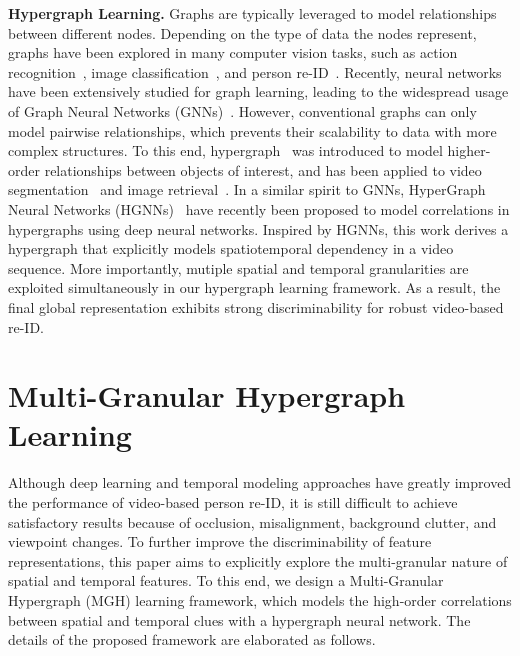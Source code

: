 \documentclass[10pt,twocolumn,letterpaper]{article}
\begin{document}
\textbf{Hypergraph Learning.}
Graphs are typically leveraged to model relationships between different nodes. Depending on the type of data the nodes represent, graphs have been explored in many computer vision tasks, such as action recognition~\cite{DBLP:conf/eccv/WangG18}, image classification~\cite{DBLP:conf/cvpr/ChenWWG19}, and person re-ID~\cite{DBLP:conf/cvpr/Chen0LSW18,DBLP:conf/eccv/ShenLYCW18}. Recently,
neural networks have been extensively studied for graph learning, leading to the widespread usage of Graph Neural Networks (GNNs)~\cite{DBLP:journals/tnn/ScarselliGTHM09,DBLP:conf/nips/DefferrardBV16,DBLP:conf/nips/DuvenaudMABHAA15,DBLP:conf/miccai/KtenaPFRLGR17,Wang_2019_ICCV}. However, conventional graphs can only model pairwise relationships, which prevents their scalability to data with more complex structures. To this end, hypergraph~\cite{DBLP:conf/nips/ZhouHS06} was introduced to model higher-order relationships between objects of interest, and has been applied to video segmentation~\cite{DBLP:conf/cvpr/HuangLM09} and image retrieval~\cite{DBLP:conf/cvpr/HuangLZM10}. In a similar spirit to GNNs, HyperGraph Neural Networks (HGNNs)~\cite{DBLP:conf/aaai/FengYZJG19,DBLP:journals/corr/abs-1809-02589,DBLP:journals/corr/abs-1901-08150,DBLP:conf/ijcai/JiangWFCG19} have recently been proposed to model correlations in hypergraphs using deep neural networks. Inspired by HGNNs, this work derives a hypergraph that explicitly models spatiotemporal dependency in a video sequence. More importantly, mutiple spatial and temporal granularities are exploited simultaneously in our hypergraph learning framework. As a result, the final global representation exhibits strong discriminability for robust video-based re-ID.


\section{Multi-Granular Hypergraph Learning}
Although deep learning and temporal modeling approaches have greatly improved the performance of video-based person re-ID, it is still difficult to achieve satisfactory results because of occlusion, misalignment, background clutter, and viewpoint changes. To further improve the discriminability of feature representations, this paper aims to explicitly explore the multi-granular nature of spatial and temporal features. To this end, we design a Multi-Granular Hypergraph (MGH) learning framework, which models the high-order correlations between spatial and temporal clues with a hypergraph neural network. The details of the proposed framework are elaborated as follows.
\end{document}
